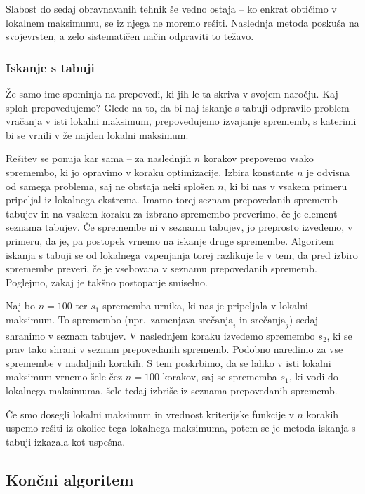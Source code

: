 \documentclass[10pt, a4paper]{article}
\begin{document}
Slabost do sedaj obravnavanih tehnik še vedno ostaja -- ko enkrat obtičimo v lokalnem
maksimumu, se iz njega ne moremo rešiti. Naslednja metoda poskuša na svojevrsten, a zelo
sistematičen način odpraviti to težavo.

\subsubsection{Iskanje s tabuji}

Že samo ime spominja na prepovedi, ki jih le-ta skriva v svojem naročju. Kaj sploh prepovedujemo?
Glede na to, da bi naj iskanje s tabuji odpravilo problem vračanja v isti lokalni maksimum,
prepovedujemo izvajanje sprememb, s katerimi bi se vrnili v že najden lokalni maksimum.

Rešitev se ponuja kar sama -- za naslednjih $n$ korakov prepovemo vsako spremembo, ki jo
opravimo v koraku optimizacije. Izbira konstante $n$ je odvisna od samega problema, saj
ne obstaja neki splošen $n$, ki bi nas v vsakem primeru pripeljal iz lokalnega ekstrema.
Imamo torej seznam prepovedanih sprememb -- tabujev in na vsakem koraku za izbrano
spremembo preverimo, če je element seznama tabujev. Če spremembe ni v seznamu tabujev, jo
preprosto izvedemo, v primeru, da je, pa postopek vrnemo na iskanje druge spremembe.
Algoritem iskanja s tabuji se od lokalnega vzpenjanja torej razlikuje le v tem, da pred
izbiro spremembe preveri, če je vsebovana v seznamu prepovedanih sprememb. Poglejmo, zakaj
je takšno postopanje smiselno.

Naj bo $n=100$ ter $s_1$ sprememba urnika, ki nas je pripeljala v lokalni maksimum. To
spremembo (npr.\ zamenjava $\text{srečanja}_i$ in $\text{srečanja}_j$) sedaj shranimo v
seznam tabujev. V naslednjem koraku izvedemo spremembo $s_2$, ki se prav tako shrani v
seznam prepovedanih sprememb. Podobno naredimo za vse spremembe v nadaljnih korakih. S
tem poskrbimo, da se lahko v isti lokalni maksimum vrnemo šele čez $n=100$ korakov, saj
se sprememba $s_1$, ki vodi do lokalnega maksimuma, šele tedaj izbriše iz seznama
prepovedanih sprememb.

Če smo dosegli lokalni maksimum in vrednost kriterijske funkcije v $n$ korakih uspemo
rešiti iz okolice tega lokalnega maksimuma, potem se je metoda iskanja s tabuji izkazala
kot uspešna.

\subsection{Končni algoritem}
\end{document}
